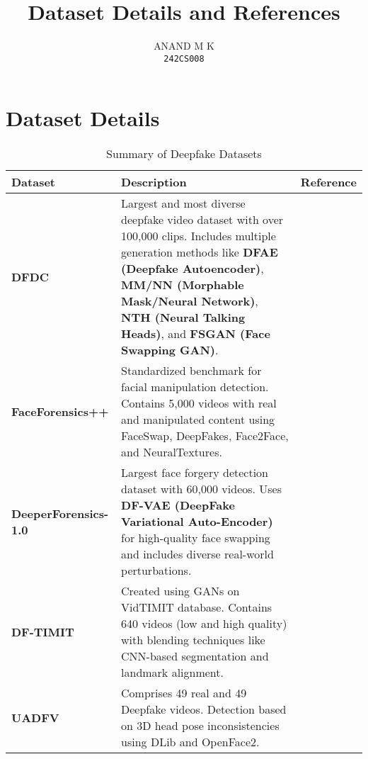 \documentclass{article}
\title{Dataset Details and References}
\author{ANAND M K \\ \texttt{242CS008}}
\date{}
\begin{document}
\maketitle

\section*{Dataset Details}

\begin{table}[ht]
    \centering
    \caption{Summary of Deepfake Datasets}
    \begin{tabular}{lp{8cm}l}
        \toprule
        \textbf{Dataset} & \textbf{Description} & \textbf{Reference} \\
        \midrule
        \textbf{DFDC} & Largest and most diverse deepfake video dataset with over 100,000 clips. Includes multiple generation methods like \textbf{DFAE (Deepfake Autoencoder)}, \textbf{MM/NN (Morphable Mask/Neural Network)}, \textbf{NTH (Neural Talking Heads)}, and \textbf{FSGAN (Face Swapping GAN)}. & \cite{dolhansky2020deepfakedetectionchallengedfdc} \\
        \textbf{FaceForensics++} & Standardized benchmark for facial manipulation detection. Contains 5,000 videos with real and manipulated content using FaceSwap, DeepFakes, Face2Face, and NeuralTextures. & \cite{Rossler_2019_ICCV} \\
        \textbf{DeeperForensics-1.0} & Largest face forgery detection dataset with 60,000 videos. Uses \textbf{DF-VAE (DeepFake Variational Auto-Encoder)} for high-quality face swapping and includes diverse real-world perturbations. & \cite{jiang2020deeperforensics} \\
        \textbf{DF-TIMIT} & Created using GANs on VidTIMIT database. Contains 640 videos (low and high quality) with blending techniques like CNN-based segmentation and landmark alignment. & \cite{Korshunov_2018} \\
        \textbf{UADFV} & Comprises 49 real and 49 Deepfake videos. Detection based on 3D head pose inconsistencies using DLib and OpenFace2. & \cite{DBLP} \\
        \bottomrule
    \end{tabular}
    \label{tab:dataset_summary}
\end{table}

\end{document}
